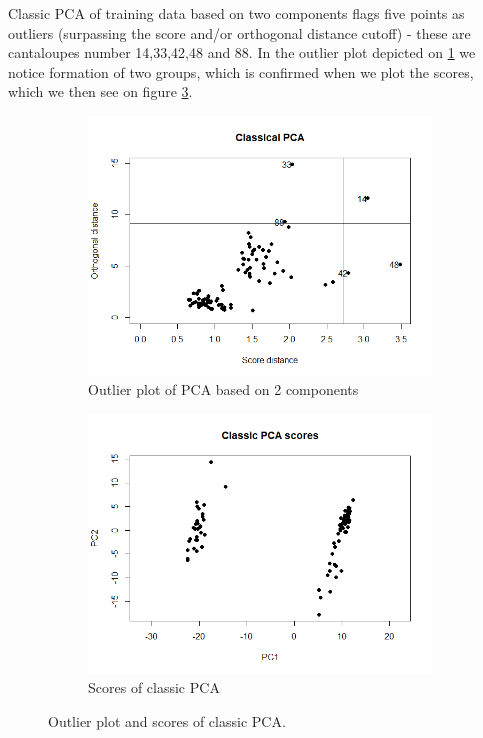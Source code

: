 \documentclass[12pt]{article}
\begin{document}
Classic PCA of training data based on two components flags five points as outliers (surpassing the score and/or orthogonal distance cutoff) - these are cantaloupes 
number 14,33,42,48 and 88. In the outlier plot depicted on \ref{fig:outlierClassic} we notice formation of two groups, which is confirmed when we plot the scores, which
we then see on figure \ref{fig:scoresClassic}.

\begin{figure}[h!]
  \begin{subfigure}[b]{0.5\linewidth}
      \centering
      \includegraphics[width=\textwidth]{../images/project1/outliersClassic.png}
   \caption{Outlier plot of PCA based on 2 components}\label{fig:outlierClassic}
  \end{subfigure}%
  \begin{subfigure}[b]{0.5\linewidth}
      \centering
   \includegraphics[width=\textwidth]{../images/project1/ClassicPCAScores.png}
   \caption{Scores of classic PCA}\label{fig:scoresClassic}
  \end{subfigure}%
 \caption{Outlier plot and scores of classic PCA.}
\end{figure}
\end{document}
